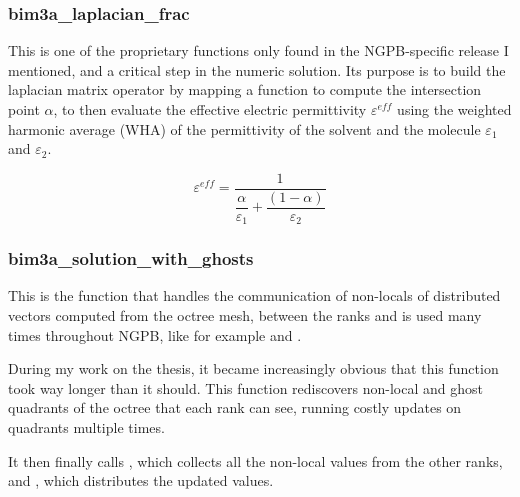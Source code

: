 \subsubsection{bim3a\_laplacian\_frac}
\label{sec:nextgenpb-libraries-bimpp-bim3a-laplacian-frac}

This is one of the proprietary functions only found in the NGPB-specific release I mentioned, and a critical step in the numeric solution.
Its purpose is to build the laplacian matrix operator by mapping a function to compute the intersection point $\alpha$, to then evaluate the effective electric permittivity $\varepsilon^{eff}$ using the weighted harmonic average (WHA) of the permittivity of the solvent and the molecule $\varepsilon_{1}$ and $\varepsilon_{2}$.

\begin{equation}
    \varepsilon^{eff} = \frac{1}{\dfrac{\alpha}{\varepsilon_1} + \dfrac{(1-\alpha)}{\varepsilon_2}}
    \label{eq:effective-permittivity}
\end{equation}



\subsubsection{bim3a\_solution\_with\_ghosts}
\label{sec:nextgenpb-libraries-bimpp-bim3a-solution-with-ghosts}

This is the function that handles the communication of non-locals of distributed vectors computed from the octree mesh, between the ranks and is used many times throughout NGPB, like for example  and .

During my work on the thesis, it became increasingly obvious that this function took way longer than it should.
This function rediscovers non-local and ghost quadrants of the octree that each rank can see, running costly updates on quadrants multiple times.

It then finally calls , which collects all the non-local values from the other ranks, and , which distributes the updated values.

